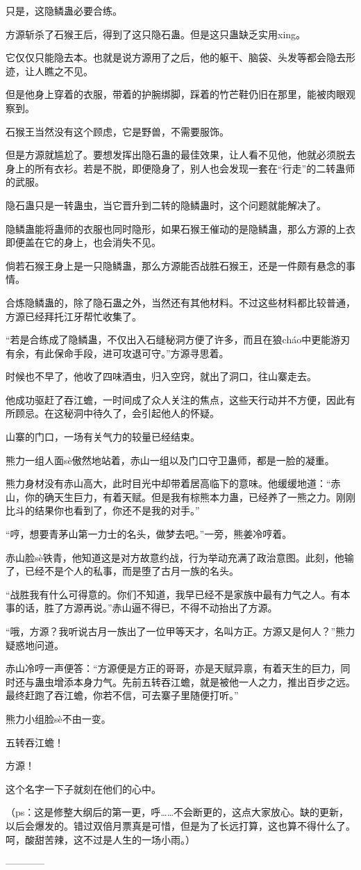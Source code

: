 \begin{this_body}
只是，这隐鳞蛊必要合练。

方源斩杀了石猴王后，得到了这只隐石蛊。但是这只蛊缺乏实用xing。

它仅仅只能隐去本。也就是说方源用了之后，他的躯干、脑袋、头发等都会隐去形迹，让人瞧之不见。

但是他身上穿着的衣服，带着的护腕绑脚，踩着的竹芒鞋仍旧在那里，能被肉眼观察到。

石猴王当然没有这个顾虑，它是野兽，不需要服饰。

但是方源就尴尬了。要想发挥出隐石蛊的最佳效果，让人看不见他，他就必须脱去身上的所有衣衫。若是不脱，即便隐身了，别人也会发现一套在“行走”的二转蛊师的武服。

隐石蛊只是一转蛊虫，当它晋升到二转的隐鳞蛊时，这个问题就能解决了。

隐鳞蛊能将蛊师的衣服也同时隐形，如果石猴王催动的是隐鳞蛊，那么方源的上衣即便盖在它的身上，也会消失不见。

倘若石猴王身上是一只隐鳞蛊，那么方源能否战胜石猴王，还是一件颇有悬念的事情。

合炼隐鳞蛊的，除了隐石蛊之外，当然还有其他材料。不过这些材料都比较普通，方源已经拜托江牙帮忙收集了。

“若是合练成了隐鳞蛊，不仅出入石缝秘洞方便了许多，而且在狼cháo中更能游刃有余，有此保命手段，进可攻退可守。”方源寻思着。

时候也不早了，他收了四味酒虫，归入空窍，就出了洞口，往山寨走去。

他成功驱赶了吞江蟾，一时间成了众人关注的焦点，这些天行动并不方便，因此有所顾忌。在这秘洞中待久了，会引起他人的怀疑。

山寨的门口，一场有关气力的较量已经结束。

熊力一组人面sè傲然地站着，赤山一组以及门口守卫蛊师，都是一脸的凝重。

熊力身材没有赤山高大，此时目光中却带着居高临下的意味。他缓缓地道：“赤山，你的确天生巨力，有着天赋。但是我有棕熊本力蛊，已经养了一熊之力。刚刚比斗的结果你也看到了，你还不是我的对手。”

“哼，想要青茅山第一力士的名头，做梦去吧。”一旁，熊姜冷哼着。

赤山脸sè铁青，他知道这是对方故意约战，行为举动充满了政治意图。此刻，他输了，已经不是个人的私事，而是堕了古月一族的名头。

“战胜我有什么可得意的。你们不知道，我早已经不是家族中最有力气之人。有本事的话，胜了方源再说。”赤山逼不得已，不得不动抬出了方源。

“哦，方源？我听说古月一族出了一位甲等天才，名叫方正。方源又是何人？”熊力疑惑地问道。

赤山冷哼一声便答：“方源便是方正的哥哥，亦是天赋异禀，有着天生的巨力，同时还与蛊虫增添本身力气。先前五转吞江蟾，就是被他一人之力，推出百步之远。最终赶跑了吞江蟾，你若不信，可去寨子里随便打听。”

熊力小组脸sè不由一变。

五转吞江蟾！

方源！

这个名字一下子就刻在他们的心中。

（ps：这是修整大纲后的第一更，呼……不会断更的，这点大家放心。缺的更新，以后会爆发的。错过双倍月票真是可惜，但是为了长远打算，这也算不得什么了。呵，酸甜苦辣，这不过是人生的一场小雨。）

------------

\end{this_body}

